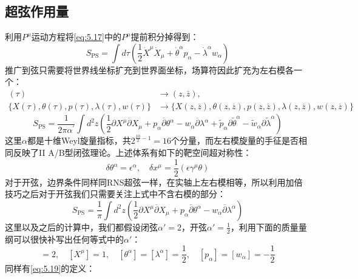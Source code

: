 \subsection{超弦作用量}
利用$P^\mu$运动方程将\ref{eq:5.17}中的$P^\mu$提前积分掉得到：
\begin{equation}
	S_{\mathrm{PS}}=\int d\tau\left(\frac{1}{2}\dot{X}^\mu\dot{X}_\mu+\dot{\theta}^\alpha p_\alpha-\dot{\lambda}^\alpha w_\alpha\right)
\end{equation}
推广到弦只需要将世界线坐标扩充到世界面坐标，场算符因此扩充为左右模各一个：
\begin{equation}
	\begin{aligned}(\tau)&\to(z,\bar{z}),\\\{X(\tau),\theta(\tau),p(\tau),\lambda(\tau),w(\tau)\}&\to\{X(z,\overline{z}),\theta(z,\overline{z}),p(z,\overline{z}),\lambda(z,\overline{z}),w(z,\overline{z})\}\end{aligned}
\end{equation}
\begin{equation}
	\boxed{
	S_{\mathrm{PS}}=\frac{1}{2\pi\alpha^{\prime}}\int d^2z\left(\frac{1}{2}\partial X^\mu\overline{\partial}X_\mu+p_\alpha\overline{\partial}\theta^\alpha-w_\alpha\overline{\partial}\lambda^\alpha+\tilde{p}_\alpha\partial\tilde{\theta}^\alpha-\tilde{w}_\alpha\partial\tilde{\lambda}^\alpha\right)
}
\end{equation}
这里$\alpha$都是十维Weyl旋量指标，共$2^{\frac{10}{2}-1}=16$个分量，而左右模旋量的手征是否相同反映了II A/B型闭弦理论。上述体系有如下的靶空间超对称性：
\begin{equation}
	\delta\theta^\alpha=\epsilon^\alpha,\quad\delta x^\mu=\frac{1}{2}(\epsilon\gamma^\mu\theta)
\end{equation}
对于开弦，边界条件同样同RNS超弦一样，在实轴上左右模相等，所以利用加倍技巧之后对于开弦我们只需要关注上式中不含右模的部分：
\begin{equation}
	\label{eq:5.23}
	S_{\mathrm{PS}}=\frac{1}{\pi}\int d^2z\left(\frac{1}{2}\partial X^\mu\overline{\partial}X_\mu+p_\alpha\overline{\partial}\theta^\alpha-w_\alpha\overline{\partial}\lambda^\alpha\right)
\end{equation}
这里以及之后的计算中，我们都假设闭弦$\alpha' = 2$，开弦$\alpha'=\frac12$，利用下面的质量量纲可以很快补写出任何等式中的$\alpha'$：
\begin{equation}
	[\alpha^{\prime}]=2,\quad[X^\mu]=1,\quad[\theta^\alpha]=[\lambda^\alpha]=\frac{1}{2},\quad[p_\alpha]=[w_\alpha]=-\frac{1}{2}
\end{equation}
同样有\ref{eq:5.19}的定义：
